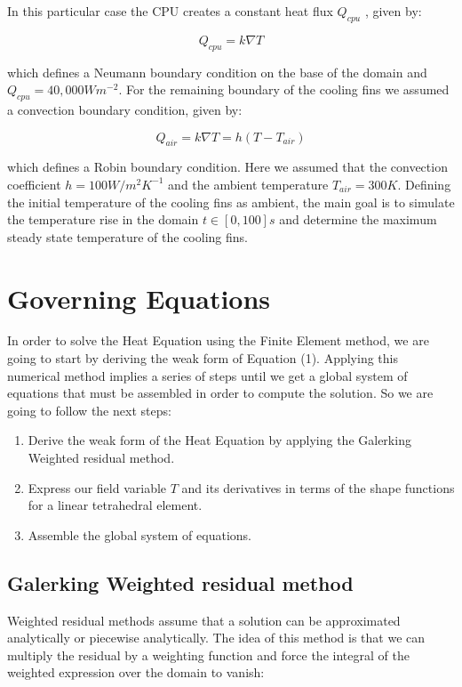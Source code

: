 \documentclass[12pt]{article}
\begin{document}
In this particular case the CPU creates a constant heat flux $Q_{cpu}$ , given by:

	\begin{equation}
		Q_{cpu} = k \nabla T
	\end{equation}
	
which defines a Neumann boundary condition on the base of the domain and $Q_{cpu} = 40,000Wm^{-2}$. For the remaining boundary of the cooling fins we assumed a convection boundary condition, given by:

	\begin{equation}
		Q_{air} = k \nabla T = h(T-T_{air})
	\end{equation}

which defines a Robin boundary condition. Here we assumed that the convection coefficient $h = 100W/m^2K^{-1}$ and the ambient temperature $T_{air} = 300K$. Defining the initial temperature of the cooling fins as ambient, the main goal is  to simulate the temperature rise in the domain $t \in [0,100]s$ and determine the maximum steady state temperature of the cooling fins.
	

	
	\section{Governing Equations}

In order to solve the Heat Equation using the Finite Element method, we are going to start by deriving the weak form of Equation (1). Applying this numerical method implies a series of steps until we get a global system of equations that must be assembled in order to compute the solution. So we are going to follow the next steps:

\begin{enumerate}
  \item Derive the weak form of the Heat Equation by applying the Galerking Weighted residual method.
  \item Express our field variable $T$ and its derivatives in terms of the shape functions for a linear tetrahedral element.
  \item Assemble the global system of equations.
\end{enumerate}

\subsection{Galerking Weighted residual method}
Weighted residual methods assume that a solution can be approximated analytically or piecewise analytically. The idea of this method is that we can multiply the residual by a weighting function and force the integral of the weighted expression over the domain to vanish:
\end{document}
